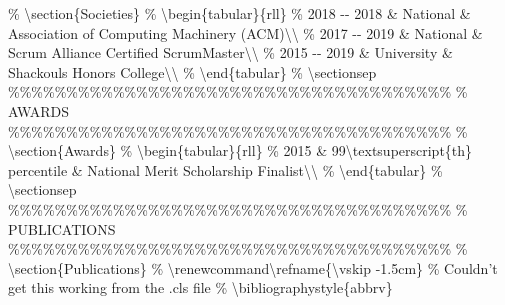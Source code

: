 \documentclass{article}%
\begin{document}
\newline%
\% \textbackslash{}section\{Societies\}\newline%
\newline%
\% \textbackslash{}begin\{tabular\}\{rll\}\newline%
\% 2018 {-}{-} 2018    \& National      \& Association of Computing Machinery (ACM)\textbackslash{}\textbackslash{}\newline%
\% 2017 {-}{-} 2019	\& National      \& Scrum Alliance Certified ScrumMaster\textbackslash{}\textbackslash{}\newline%
\% 2015 {-}{-} 2019    \& University    \& Shackouls Honors College\textbackslash{}\textbackslash{}\newline%
\% \textbackslash{}end\{tabular\}\newline%
\% \textbackslash{}sectionsep\newline%
\newline%
\%\%\%\%\%\%\%\%\%\%\%\%\%\%\%\%\%\%\%\%\%\%\%\%\%\%\%\%\%\%\%\%\%\%\%\%\%\%\newline%
\%     AWARDS\newline%
\%\%\%\%\%\%\%\%\%\%\%\%\%\%\%\%\%\%\%\%\%\%\%\%\%\%\%\%\%\%\%\%\%\%\%\%\%\%\newline%
\newline%
\% \textbackslash{}section\{Awards\}\newline%
\% \textbackslash{}begin\{tabular\}\{rll\}\newline%
\% 2015        \& 99\textbackslash{}textsuperscript\{th\} percentile \& National Merit Scholarship Finalist\textbackslash{}\textbackslash{}\newline%
\% \textbackslash{}end\{tabular\}\newline%
\% \textbackslash{}sectionsep\newline%
\newline%
\%\%\%\%\%\%\%\%\%\%\%\%\%\%\%\%\%\%\%\%\%\%\%\%\%\%\%\%\%\%\%\%\%\%\%\%\%\%\newline%
\%     PUBLICATIONS\newline%
\%\%\%\%\%\%\%\%\%\%\%\%\%\%\%\%\%\%\%\%\%\%\%\%\%\%\%\%\%\%\%\%\%\%\%\%\%\%\newline%
\newline%
\% \textbackslash{}section\{Publications\}\newline%
\% \textbackslash{}renewcommand\textbackslash{}refname\{\textbackslash{}vskip {-}1.5cm\} \% Couldn't get this working from the .cls file\newline%
\% \textbackslash{}bibliographystyle\{abbrv\}\newline%
\end{document}
